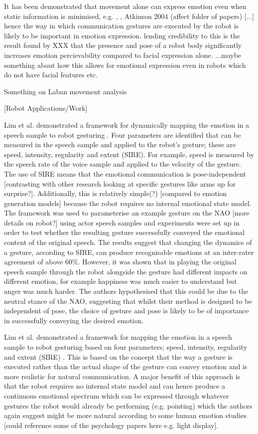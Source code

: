 \documentclass[]{article}
\begin{document}
It has been demonstrated that movement alone can express emotion even when static information is minimised, e.g. \cite{dittrich1996perception}, \cite{pollick2001perceiving}, Atkinson 2004 (affect folder of papers) [...] hence the way in which communication gestures are executed by the robot is likely to be important in emotion expression. lending credibility to this is the result found by XXX that the presence and pose of a robot body significantly increases emotion percievability compared to facial expression alone. ...maybe something about how this allows for emotional expression even in robots which do not have facial features etc.  

Something on Laban movement analysis

[Robot Applications/Work]

Lim et al. demonstrated a framework for dynamically mapping the emotion in a speech sample to robot gesturing \cite{lim2011converting}. Four parameters are identified that can be measured in the speech sample and applied to the robot's gesture; these are speed, intensity, regularity and extent (SIRE). For example, speed is measured by the speech rate of the voice sample and applied to the velocity of the gesture. The use of SIRE means that the emotional communication is pose-independent [contrasting with other research looking at specific gestures like arms up for surprise?]. Additionally, this is relatively simple(?) [compared to emotion generation models] because the robot requires no internal emotional state model. The framework was used to parameterise an example gesture on the NAO [more details on robot?] using actor speech samples and experiments were set up in order to test whether the resulting gesture successfully conveyed the emotional content of the original speech. The results suggest that changing the dynamics of a gesture, according to SIRE, can produce recognisable emotions at an inter-rater agreement of above 60\%. However, it was shown that in playing the original speech sample through the robot alongside the gesture had different impacts on different emotion, for example happiness was much easier to understand but anger was much harder. The authors hypothesised that this could be due to the neutral stance of the NAO, suggesting that whilst their method is designed to be independent of pose, the choice of gesture and pose is likely to be of importance in successfully conveying the desired emotion.

Lim et al. demonstrated a framework for mapping the emotion in a speech sample to robot gesturing based on four parameters;  speed, intensity, regularity and extent (SIRE) \cite{lim2011converting}. This is based on the concept that the way a gesture is executed rather than the actual shape of the gesture can convey emotion and is more realistic for natural communication. A major benefit of this approach is that the robot requires no internal state model and can hence produce a continuous emotional spectrum which can be expressed through whatever gestures the robot would already be performing (e.g. pointing) which the authors again suggest might be more natural according to some human emotion studies [could reference some of the psychology papers here e.g. light display].
\end{document}
